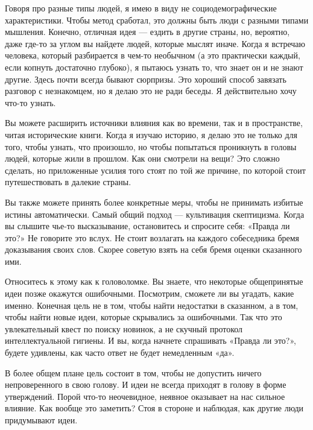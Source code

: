 \documentclass[ebook,12pt,oneside,openany]{memoir}
\begin{document}
Говоря про разные типы людей, я имею в виду не социодемографические
характеристики. Чтобы метод сработал, это должны быть люди с разными
типами мышления. Конечно, отличная идея — ездить в другие страны, но,
вероятно, даже где-то за углом вы найдете людей, которые мыслят иначе.
Когда я встречаю человека, который разбирается в чем-то необычном (а
это практически каждый, если копнуть достаточно глубоко), я пытаюсь
узнать то, что знает он и не знают другие. Здесь почти всегда бывают
сюрпризы. Это хороший способ завязать разговор с незнакомцем, но я
делаю это не ради беседы. Я действительно хочу что-то узнать. \newline

Вы можете расширить источники влияния как во времени, так и в
пространстве, читая исторические книги. Когда я изучаю историю, я
делаю это не только для того, чтобы узнать, что произошло, но чтобы
попытаться проникнуть в головы людей, которые жили в прошлом. Как они
смотрели на вещи? Это сложно сделать, но приложенные усилия того стоят
по той же причине, по которой стоит путешествовать в далекие страны. \newline

Вы также можете принять более конкретные меры, чтобы не принимать
избитые истины автоматически. Самый общий подход — культивация
скептицизма. Когда вы слышите чье-то высказывание, остановитесь и
спросите себя: «Правда ли это?» Не говорите это вслух. Не стоит
возлагать на каждого собеседника бремя доказывания своих слов. Скорее
советую взять на себя бремя оценки сказанного ими. \newline

Относитесь к этому как к головоломке. Вы знаете, что некоторые
общепринятые идеи позже окажутся ошибочными. Посмотрим, сможете ли вы
угадать, какие именно. Конечная цель не в том, чтобы найти недостатки
в сказанном, а в том, чтобы найти новые идеи, которые скрывались за
ошибочными. Так что это увлекательный квест по поиску новинок, а не
скучный протокол интеллектуальной гигиены. И вы, когда начнете
спрашивать «Правда ли это?», будете удивлены, как часто ответ не будет
немедленным «да». \newline

В более общем плане цель состоит в том, чтобы не допустить ничего
непроверенного в свою голову. И идеи не всегда приходят в голову в
форме утверждений. Порой что-то неочевидное, неявное оказывает на нас
сильное влияние. Как вообще это заметить? Стоя в стороне и наблюдая,
как другие люди придумывают идеи. \newline
\end{document}
